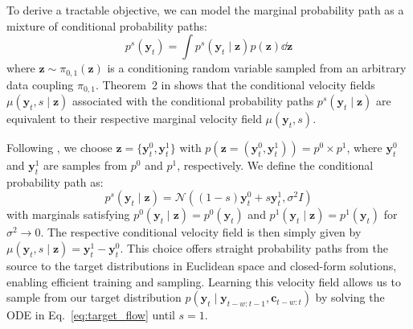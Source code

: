 \documentclass[preprint,12pt,authoryear]{elsarticle}
\begin{document}
To derive a tractable objective, we can model the marginal probability path as a mixture of conditional probability paths:
\begin{equation}
p^s(\mathbf{y}_{t}) = \int p^s(\mathbf{y}_{t} \mid \mathbf{z})p(\mathbf{z})\dd \mathbf{z}
\end{equation}
where $\mathbf{z} \sim \pi_{0,1}(\mathbf{z})$ is a conditioning random variable sampled from an arbitrary data coupling $\pi_{0,1}$.
Theorem~2 in \citet{Lipman2022} shows that the conditional velocity fields $\mu(\mathbf{y}_{t}, s\mid\mathbf{z})$ associated with the conditional probability paths $p^s(\mathbf{y}_{t} \mid \mathbf{z})$ are equivalent to their respective marginal velocity field $\mu(\mathbf{y}_{t}, s)$.

Following \citet{tong2023improving}, we choose $\mathbf{z} = \{\mathbf{y}^0_t, \mathbf{y}_t^1\}$ with $p(\mathbf{z}=(\mathbf{y}_t^0, \mathbf{y}_t^1)) = p^0 \times p^1$, where $\mathbf{y}_t^0$ and $\mathbf{y}_t^1$ are samples from $p^0$ and $p^1$, respectively. We define the conditional probability path as:
\begin{equation}
p^s(\mathbf{y}_t \mid \mathbf{z}) = \mathcal{N}((1-s)\mathbf{y}_t^0 + s\mathbf{y}_t^1, \sigma^2 I)
\label{eq:prob_path}
\end{equation}
with marginals satisfying $p^0(\mathbf{y}_t\mid\mathbf{z})= p^0(\mathbf{y}_t)$ and $p^1(\mathbf{y}_t \mid \mathbf{z}) = p^1(\mathbf{y}_t)$ for $\sigma^2 \to 0$. The respective conditional velocity field is then simply given by $\mu(\mathbf{y}_t, s\mid\mathbf{z}) = \mathbf{y}_t^1 - \mathbf{y}_t^0$.
This choice offers straight probability paths from the source to the target distributions in Euclidean space and closed-form solutions, enabling efficient training and sampling. Learning this velocity field allows us to sample from our target distribution $p(\mathbf{y}_{t} \mid \mathbf{y}_{t-w:t-1}, \mathbf{c}_{t-w:t})$ by solving the ODE in
Eq.~\eqref{eq:target_flow} until $s=1$. 
\end{document}
